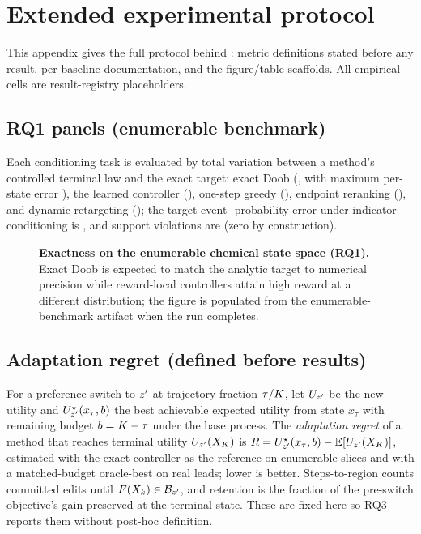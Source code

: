 \section{Extended experimental protocol}
\label{app:experiments}

This appendix gives the full protocol behind : metric definitions stated before any
result, per-baseline documentation, and the figure/table scaffolds. All empirical cells are result-registry
placeholders.

\subsection{RQ1 panels (enumerable benchmark)}
Each conditioning task is evaluated by total variation between a method's controlled terminal law and the
exact target: exact Doob (, with maximum per-state error ),
the learned controller (), one-step greedy (), endpoint
reranking (), and dynamic retargeting (); the target-event-%
probability error under indicator conditioning is , and support violations are
 (zero by construction).

\begin{figure}[h]
\centering
{}
\caption{\textbf{Exactness on the enumerable chemical state space (RQ1).} Exact Doob is expected to match
the analytic target to numerical precision while reward-local controllers attain high reward at a
different distribution; the figure is populated from the enumerable-benchmark artifact when the run
completes.}
\label{fig:e0}
\end{figure}

\subsection{Adaptation regret (defined before results)}
For a preference switch to $z'$ at trajectory fraction $\tau/K$, let $U_{z'}$ be the new
utility and $U^\star_{z'}(x_\tau,b)$ the best achievable expected utility from state $x_\tau$ with
remaining budget $b=K-\tau$ under the base process. The \emph{adaptation regret} of a method that
reaches terminal utility $U_{z'}(X_K)$ is $R=U^\star_{z'}(x_\tau,b)-\mathbb{E}[U_{z'}
(X_K)]$, estimated with the exact controller as the reference on enumerable slices and with a
matched-budget oracle-best on real leads; lower is better. Steps-to-region counts committed edits until
$F(X_k)\in\mathcal{B}_{z'}$, and retention is the fraction of the pre-switch objective's gain preserved
at the terminal state. These are fixed here so RQ3 reports them without post-hoc definition.

